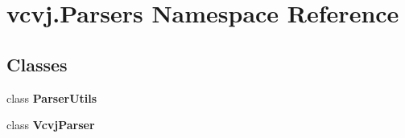 \hypertarget{namespacevcvj_1_1_parsers}{}\section{vcvj.\+Parsers Namespace Reference}
\label{namespacevcvj_1_1_parsers}
\subsection*{Classes}
\begin{DoxyCompactItemize}
\item 
class {\bfseries Parser\+Utils}
\item 
class {\bfseries Vcvj\+Parser}
\end{DoxyCompactItemize}
